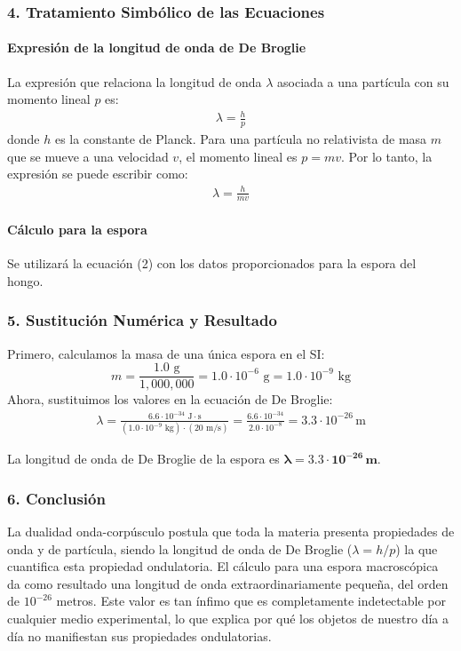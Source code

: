 \subsubsection*{4. Tratamiento Simbólico de las Ecuaciones}
\paragraph*{Expresión de la longitud de onda de De Broglie}
La expresión que relaciona la longitud de onda $\lambda$ asociada a una partícula con su momento lineal $p$ es:
\begin{gather}
    \lambda = \frac{h}{p}
\end{gather}
donde $h$ es la constante de Planck. Para una partícula no relativista de masa $m$ que se mueve a una velocidad $v$, el momento lineal es $p=mv$. Por lo tanto, la expresión se puede escribir como:
\begin{gather}
    \lambda = \frac{h}{mv}
\end{gather}

\paragraph*{Cálculo para la espora}
Se utilizará la ecuación (2) con los datos proporcionados para la espora del hongo.

\subsubsection*{5. Sustitución Numérica y Resultado}
Primero, calculamos la masa de una única espora en el SI:
$$ m = \frac{1.0 \text{ g}}{1,000,000} = 1.0 \cdot 10^{-6} \text{ g} = 1.0 \cdot 10^{-9} \text{ kg} $$
Ahora, sustituimos los valores en la ecuación de De Broglie:
\begin{gather}
    \lambda = \frac{6.6 \cdot 10^{-34} \text{ J}\cdot\text{s}}{(1.0 \cdot 10^{-9} \text{ kg}) \cdot (20 \text{ m/s})} = \frac{6.6 \cdot 10^{-34}}{2.0 \cdot 10^{-8}} = 3.3 \cdot 10^{-26} \, \text{m}
\end{gather}
\begin{cajaresultado}
    La longitud de onda de De Broglie de la espora es $\boldsymbol{\lambda = 3.3 \cdot 10^{-26} \, \textbf{m}}$.
\end{cajaresultado}

\subsubsection*{6. Conclusión}
\begin{cajaconclusion}
La dualidad onda-corpúsculo postula que toda la materia presenta propiedades de onda y de partícula, siendo la longitud de onda de De Broglie ($\lambda=h/p$) la que cuantifica esta propiedad ondulatoria. El cálculo para una espora macroscópica da como resultado una longitud de onda extraordinariamente pequeña, del orden de $10^{-26}$ metros. Este valor es tan ínfimo que es completamente indetectable por cualquier medio experimental, lo que explica por qué los objetos de nuestro día a día no manifiestan sus propiedades ondulatorias.
\end{cajaconclusion}

